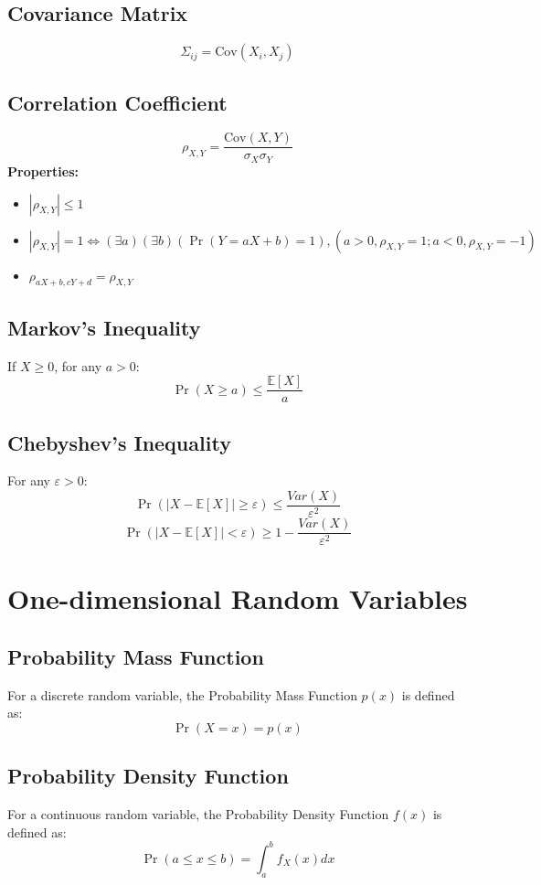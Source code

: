\documentclass{article}
\begin{document}
\subsection{Covariance Matrix}
\[
    \Sigma_{ij} = \text{Cov}(X_i, X_j)
\]

\subsection{Correlation Coefficient}
\[
    \rho_{X,Y} = \frac{\text{Cov}(X,Y)}{\sigma_X\sigma_Y}
\]
\textbf{Properties:}
\begin{itemize}
    \item \( |\rho_{X,Y}| \le 1 \)
    \item \( |\rho_{X,Y}| = 1 \Leftrightarrow (\exists a)(\exists b)(\Pr(Y=aX+b)=1), (a>0, \rho_{X,Y}=1; a<0, \rho_{X,Y}=-1) \)
    \item \( \rho_{aX + b, cY + d} = \rho_{X,Y} \)
\end{itemize}

\subsection{Markov's Inequality}
If \( X \geq 0 \), for any \( a > 0 \):
\[
    \Pr(X \geq a) \leq \frac{\mathbb{E}[X]}{a}
\]

\subsection{Chebyshev's Inequality}
For any \( \varepsilon > 0 \):
\[
    \Pr(|X-\mathbb{E}[X]| \ge \varepsilon) \le \frac{Var(X)}{\varepsilon^2}
\]
\[
    \Pr(|X-\mathbb{E}[X]| < \varepsilon) \ge 1 - \frac{Var(X)}{\varepsilon^2}
\]

\newpage
\section{One-dimensional Random Variables}

\subsection{Probability Mass Function}
For a discrete random variable, the Probability Mass Function \( p(x) \) is defined as:
\[
    \Pr(X=x) = p(x)
\]

\subsection{Probability Density Function}
For a continuous random variable, the Probability Density Function \( f(x) \) is defined as:
\[
    \Pr(a \le x \le b) = \int_{a}^{b} f_X(x)dx
\]
\end{document}
